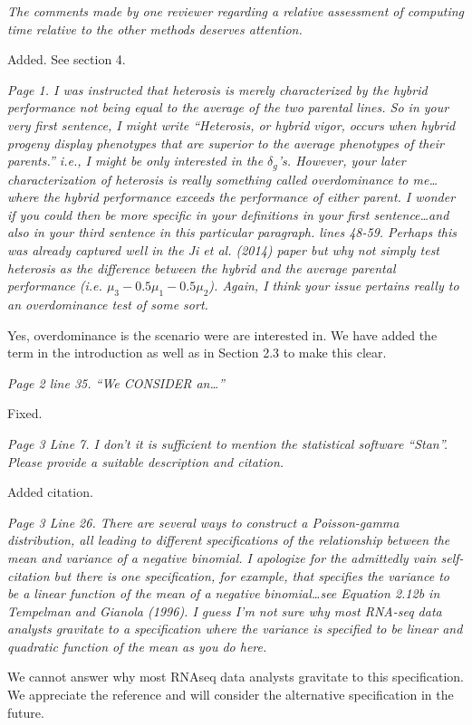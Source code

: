 \documentclass{article}
\newcommand{\comment}[1]{\textit{#1}}
\newcommand{\response}[1]{#1}
\begin{document}
\comment{The comments made by one reviewer regarding a relative assessment of computing time relative to the other methods deserves attention.}

\response{Added. See section 4.}

\comment{Page 1.  I was instructed that heterosis is merely characterized by the hybrid performance not being equal to the average of the two parental lines.  So in your very first sentence, I might write “Heterosis, or hybrid vigor, occurs when hybrid progeny display phenotypes that are superior to the average phenotypes of their parents.” i.e., I might be only interested in the $\delta_g$’s. However, your later characterization of heterosis is really something called overdominance to me…where the hybrid performance exceeds the performance of either parent.  I wonder if you could then be more specific in your definitions in your first sentence…and also in your third sentence in this particular paragraph. lines 48-59.  Perhaps this was already captured well in the Ji et al. (2014) paper but why not simply test heterosis as the difference between the hybrid and the average parental performance (i.e. $\mu_3 - 0.5 \mu_1 - 0.5 \mu_2$).  Again, I think your issue pertains really to an overdominance test of some sort.}

\response{Yes, overdominance is the scenario were are interested in. We have added the term in the introduction as well as in Section 2.3 to make this clear.}

\comment{Page 2 line 35.  “We CONSIDER an…”}

\response{Fixed.}

\comment{Page 3 Line 7.  I don’t it is sufficient to mention the statistical software “Stan”.  Please provide a suitable description and citation.}

\response{Added citation.}

\comment{Page 3 Line 26.  There are several ways to construct a Poisson-gamma distribution, all leading to different specifications of the relationship between the mean and variance of a negative binomial.  I apologize for the admittedly vain self-citation but there is one specification, for example, that specifies the variance to be a linear function of the mean of a negative binomial…see Equation 2.12b in  Tempelman and Gianola (1996).  I guess I’m not sure why most RNA-seq data analysts gravitate to a specification where the variance is specified to be linear and quadratic function of the mean as you do here.}

\response{We cannot answer why most RNAseq data analysts gravitate to this specification. We appreciate the reference and will consider the alternative specification in the future.}
\end{document}
